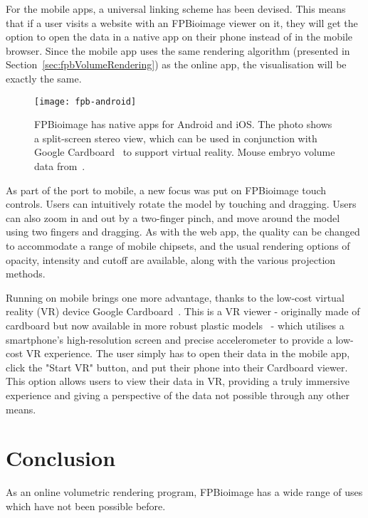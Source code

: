 For the mobile apps, a universal linking scheme has been devised.
This means that if a user visits a website with an FPBioimage viewer on it, they will get the option to open the data in a native app on their phone instead of in the mobile browser.
Since the mobile app uses the same rendering algorithm (presented in Section~\ref{sec:fpbVolumeRendering}) as the online app, the visualisation will be exactly the same.

\begin{figure}[t!]
\centering
\texttt{[image: fpb-android]}
\caption[FPBioimage: The FPBioimage mobile app provides volumetric rendering in virtual reality]{FPBioimage has native apps for Android and iOS. The photo shows a split-screen stereo view, which can be used in conjunction with Google Cardboard~\cite{cardboard} to support virtual reality. Mouse embryo volume data from~\cite{sharpe2002optical}. } %
\label{fig:fpbMobile}
\end{figure}

As part of the port to mobile, a new focus was put on FPBioimage touch controls.
Users can intuitively rotate the model by touching and dragging.
Users can also zoom in and out by a two-finger pinch, and move around the model using two fingers and dragging.
As with the web app, the quality can be changed to accommodate a range of mobile chipsets, and the usual rendering options of opacity, intensity and cutoff are available, along with the various projection methods.

Running on mobile brings one more advantage, thanks to the low-cost virtual reality (VR) device Google Cardboard~\cite{cardboard}.
This is a VR viewer - originally made of cardboard but now available in more robust plastic models~\cite{get2018cardboard} - which utilises a smartphone's high-resolution screen and precise accelerometer to provide a low-cost VR experience.
The user simply has to open their data in the mobile app, click the "Start VR" button, and put their phone into their Cardboard viewer.
This option allows users to view their data in VR, providing a truly immersive experience and giving a perspective of the data not possible through any other means.



\section{Conclusion} %
As an online volumetric rendering program, FPBioimage has a wide range of uses which have not been possible before.

